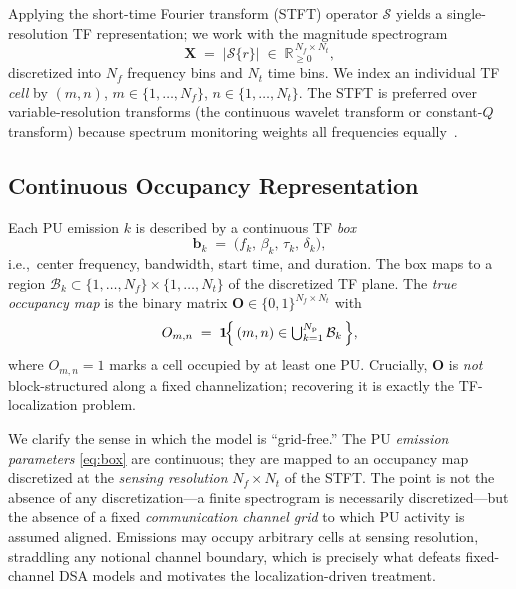 \documentclass[journal]{IEEEtran}
\newcommand{\R}{\mathbb{R}}
\newcommand{\Ind}{\mathbf{1}}             %
\newcommand{\rx}{r}                       %
\newcommand{\Npu}{N_{\mathrm{p}}}          %
\newcommand{\STFT}{\mathcal{S}}            %
\newcommand{\spec}{\bm{X}}                 %
\newcommand{\Nf}{N_f}                      %
\newcommand{\Nt}{N_t}                      %
\newcommand{\cell}{(m,n)}                  %
\newcommand{\boxk}{\bm{b}}                 %
\newcommand{\bfc}{f}                       %
\newcommand{\bBW}{\beta}                   %
\newcommand{\bts}{\tau}                    %
\newcommand{\bdur}{\delta}                 %
\newcommand{\occ}{O}                       %
\newcommand{\occmap}{\bm{O}}               %
\begin{document}
Applying the short-time Fourier transform (STFT) operator $\STFT$ yields a
single-resolution TF representation; we work with the
magnitude spectrogram
\begin{equation}
\spec \;=\; \bigl|\STFT\{\rx\}\bigr| \;\in\; \R_{\ge 0}^{\,\Nf \times \Nt},
\label{eq:stft}
\end{equation}
discretized into $\Nf$ frequency bins and $\Nt$ time bins. We index an
individual TF \emph{cell} by $\cell$, $m\in\{1,\dots,\Nf\}$,
$n\in\{1,\dots,\Nt\}$. The STFT is preferred over variable-resolution
transforms (the continuous wavelet transform or constant-$Q$ transform)
because spectrum monitoring weights all frequencies equally~\cite{prasad2020}.

\subsection{Continuous Occupancy Representation}
\label{subsec:occupancy}
Each PU emission $k$ is described by a continuous TF \emph{box}
\begin{equation}
\boxk_k \;=\; \bigl(\bfc_k,\, \bBW_k,\, \bts_k,\, \bdur_k\bigr),
\label{eq:box}
\end{equation}
i.e.,\ center frequency, bandwidth, start time, and duration. The box maps to
a region $\mathcal{B}_k \subset \{1,\dots,\Nf\}\times\{1,\dots,\Nt\}$ of the
discretized TF plane. The \emph{true occupancy map} is the binary matrix
$\occmap\in\{0,1\}^{\Nf\times\Nt}$ with
\begin{equation}
\occ_{m,n} \;=\;
\Ind\!\Bigl\{\, \cell \in \textstyle\bigcup_{k=1}^{\Npu}\mathcal{B}_k \,\Bigr\},
\label{eq:occupancy}
\end{equation}
where $\occ_{m,n}=1$ marks a cell occupied by at least one PU. Crucially,
$\occmap$ is \emph{not} block-structured along a fixed channelization;
recovering it is exactly the TF-localization problem.

We clarify the sense in which the model is ``grid-free.'' The PU
\emph{emission parameters} \eqref{eq:box} are continuous; they are mapped to
an occupancy map discretized at the \emph{sensing resolution} $\Nf\times\Nt$
of the STFT. The point is not the absence of any discretization---a finite
spectrogram is necessarily discretized---but the absence of a fixed
\emph{communication channel grid} to which PU activity is assumed aligned.
Emissions may occupy arbitrary cells at sensing resolution, straddling any
notional channel boundary, which is precisely what defeats fixed-channel DSA
models and motivates the localization-driven treatment.
\end{document}
